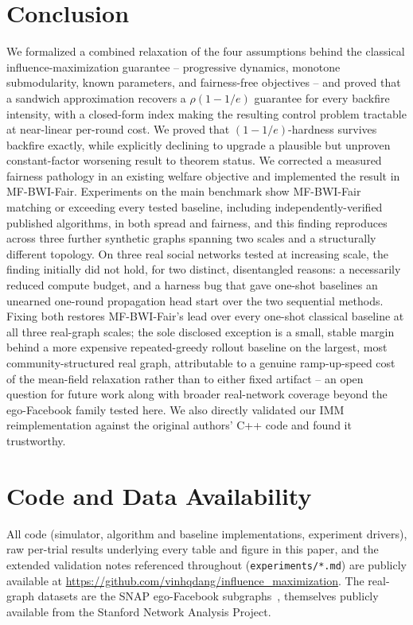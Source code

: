 \documentclass[journal]{IEEEtran}
\begin{document}
\section{Conclusion}

We formalized a combined relaxation of the four assumptions behind the
classical influence-maximization guarantee -- progressive dynamics,
monotone submodularity, known parameters, and fairness-free objectives --
and proved that a sandwich approximation recovers a $\rho(1-1/e)$ guarantee
for every backfire intensity, with a closed-form index making the
resulting control problem tractable at near-linear per-round cost. We
proved that $(1-1/e)$-hardness survives backfire exactly, while explicitly
declining to upgrade a plausible but unproven constant-factor worsening
result to theorem status. We corrected a measured fairness pathology in an
existing welfare objective and implemented the result in MF-BWI-Fair.
Experiments on the main benchmark show MF-BWI-Fair matching or exceeding
every tested baseline, including independently-verified published
algorithms, in both spread and fairness, and this finding reproduces
across three further synthetic graphs spanning two scales and a
structurally different topology. On three real social networks tested at
increasing scale, the finding initially did not hold, for two distinct,
disentangled reasons: a necessarily reduced compute budget, and a harness
bug that gave one-shot baselines an unearned one-round propagation head
start over the two sequential methods. Fixing both restores MF-BWI-Fair's
lead over every one-shot classical baseline at all three real-graph
scales; the sole disclosed exception is a small, stable margin behind a
more expensive repeated-greedy rollout baseline on the largest, most
community-structured real graph, attributable to a genuine ramp-up-speed
cost of the mean-field relaxation rather than to either fixed artifact --
an open question for future work along with broader real-network
coverage beyond the ego-Facebook family tested here. We also directly
validated our IMM reimplementation against the original authors' C++ code
and found it trustworthy.

\section*{Code and Data Availability}
All code (simulator, algorithm and baseline implementations, experiment
drivers), raw per-trial results underlying every table and figure in this
paper, and the extended validation notes referenced throughout
(\texttt{experiments/*.md}) are publicly available at
\url{https://github.com/vinhqdang/influence_maximization}. The real-graph
datasets are the SNAP ego-Facebook subgraphs~\cite{mcauley2012learning},
themselves publicly available from the Stanford Network Analysis Project.



\end{document}
